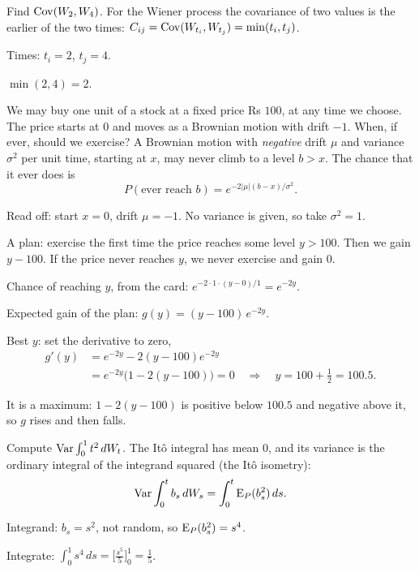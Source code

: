 \begin{problem}[Q1(d)]
Find $\operatorname{Cov}(W_2,W_4)$.
\cardsays For the Wiener process the covariance of two values is the earlier of the two times: $C_{ij}=\operatorname{Cov}(W_{t_i},W_{t_j})=\min(t_i,t_j)$.
\working
\begin{steps}
\item Times: $t_i=2$, $t_j=4$.
\item $\min(2,4)=2$.
\end{steps}
\end{problem}

\begin{problem}[Q1(e)]
We may buy one unit of a stock at a fixed price Rs $100$, at any time we choose. The price starts at $0$ and moves as a Brownian motion with drift $-1$. When, if ever, should we exercise?
\cardsays A Brownian motion with \emph{negative} drift $\mu$ and variance $\sigma^2$ per unit time, starting at $x$, may never climb to a level $b>x$. The chance that it ever does is
\[
P(\text{ever reach }b)=e^{-2|\mu|(b-x)/\sigma^2}.
\]
\working
\begin{steps}
\item Read off: start $x=0$, drift $\mu=-1$. No variance is given, so take $\sigma^2=1$.
\item A plan: exercise the first time the price reaches some level $y>100$. Then we gain $y-100$. If the price never reaches $y$, we never exercise and gain $0$.
\item Chance of reaching $y$, from the card: $e^{-2\cdot1\cdot(y-0)/1}=e^{-2y}$.
\item Expected gain of the plan: $g(y)=(y-100)\,e^{-2y}$.
\item Best $y$: set the derivative to zero,
\[
\begin{aligned}
g'(y)&=e^{-2y}-2(y-100)e^{-2y}\\
&=e^{-2y}\big(1-2(y-100)\big)=0\quad\Longrightarrow\quad y=100+\tfrac12=100.5.
\end{aligned}
\]
\item It is a maximum: $1-2(y-100)$ is positive below $100.5$ and negative above it, so $g$ rises and then falls.
\end{steps}
\end{problem}

\begin{problem}[Q1(f)]
Compute $\operatorname{Var}\int_0^1t^2\,dW_t$.
\cardsays The Itô integral has mean $0$, and its variance is the ordinary integral of the integrand squared (the Itô isometry):
\[
\operatorname{Var}\int_0^tb_s\,dW_s=\int_0^t\operatorname{E}_P(b_s^2)\,ds.
\]
\working
\begin{steps}
\item Integrand: $b_s=s^2$, not random, so $\operatorname{E}_P(b_s^2)=s^4$.
\item Integrate: $\int_0^1s^4\,ds=\Big[\frac{s^5}5\Big]_0^1=\frac15$.
\end{steps}
\end{problem}


